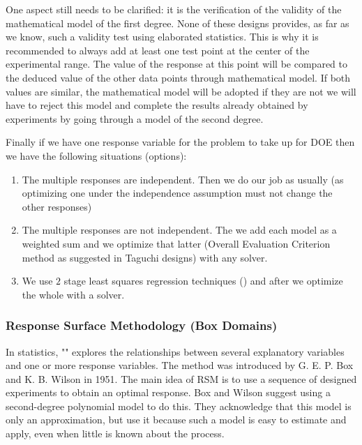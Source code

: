 	One aspect still needs to be clarified: it is the verification of the validity of the mathematical model of the first degree. None of these designs provides, as far as we know, such a validity test using elaborated statistics. This is why it is recommended to always add at least one test point at the center of the experimental range. The value of the response at this point will be compared to the deduced value of the other data points through mathematical model. If both values are similar, the mathematical model will be adopted if they are not we will have to reject this model and complete the results already obtained by experiments by going through a model of the second degree.

	
	Finally if we have one response variable for the problem to take up for DOE then we have the following situations (options):
	\begin{enumerate}
		\item The multiple responses are independent. Then we do our job as usually (as optimizing one under the independence assumption must not change the other responses)

		\item The multiple responses are not independent. The we add each model as a weighted sum and we optimize that latter (Overall Evaluation Criterion method as suggested in Taguchi designs) with any solver.

		\item We use $2$ stage least squares regression techniques () and after we optimize the whole with a solver.				
	\end{enumerate}
	
	
	
	\pagebreak
	\subsubsection{Response Surface Methodology (Box Domains)}
	In statistics, "" explores the relationships between several explanatory variables and one or more response variables. The method was introduced by G. E. P. Box and K. B. Wilson in 1951. The main idea of RSM is to use a sequence of designed experiments to obtain an optimal response. Box and Wilson suggest using a second-degree polynomial model to do this. They acknowledge that this model is only an approximation, but use it because such a model is easy to estimate and apply, even when little is known about the process.
	
